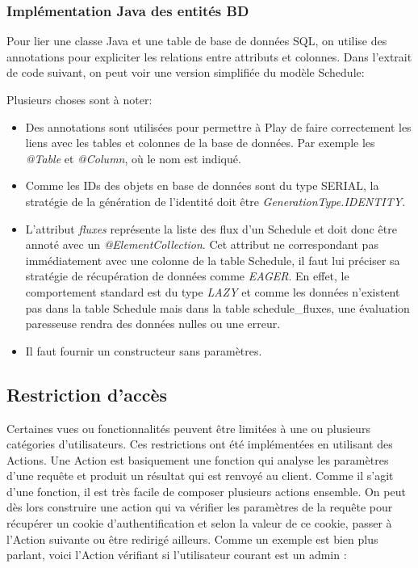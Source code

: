 \documentclass[french]{article}
\begin{document}


\subsubsection{Implémentation Java des entités BD}

Pour lier une classe Java et une table de base de données SQL, on utilise des annotations pour expliciter les relations entre attributs et colonnes. Dans l'extrait de code suivant, on peut voir une version simplifiée du modèle Schedule:



Plusieurs choses sont à noter:
\begin{itemize}
	\item Des annotations sont utilisées pour permettre à Play de faire correctement les liens avec les tables et colonnes de la base de données. Par exemple les \textit{@Table} et \textit{@Column}, où le nom est indiqué.
	\item Comme les IDs des objets en base de données sont du type SERIAL, la stratégie de la génération de l'identité doit être \textit{GenerationType.IDENTITY}.
	\item L'attribut \textit{fluxes} représente la liste des flux d'un Schedule et doit donc être annoté avec un \textit{@ElementCollection}. Cet attribut ne correspondant pas immédiatement avec une colonne de la table Schedule, il faut lui préciser sa stratégie de récupération de données comme \textit{EAGER}. En effet, le comportement standard est du type \textit{LAZY} et comme les données n'existent pas dans la table Schedule mais dans la table schedule\_fluxes, une évaluation paresseuse rendra des données nulles ou une erreur.
	\item Il faut fournir un constructeur sans paramètres.
\end{itemize}

\newpage
\subsection{Restriction d'accès}

Certaines vues ou fonctionnalités peuvent être limitées à une ou plusieurs catégories d'utilisateurs. Ces restrictions ont été implémentées en utilisant des Actions. Une Action est basiquement une fonction qui analyse les paramètres d'une requête et produit un résultat qui est renvoyé au client. Comme il s'agit d'une fonction, il est très facile de composer plusieurs actions ensemble. On peut dès lors construire une action qui va vérifier les paramètres de la requête pour récupérer un cookie d'authentification et selon la valeur de ce cookie, passer à l'Action suivante ou être redirigé ailleurs. Comme un exemple est bien plus parlant, voici l'Action vérifiant si l'utilisateur courant est un admin :
\end{document}
